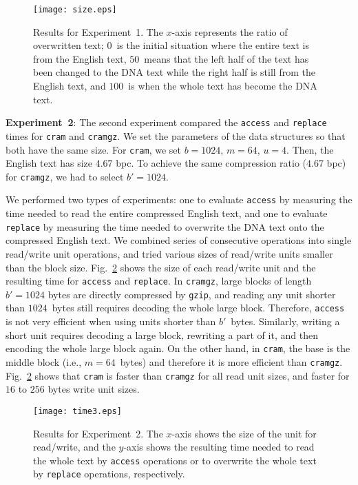 \documentclass{llncs}
\begin{document}
\begin{figure}[t!]
\begin{center}
  \texttt{[image: size.eps]}
\caption{Results for Experiment~1.
The $x$-axis represents the ratio of overwritten text;
$0$~is the initial situation where the entire text is from the English
text, $50$~means that the left half of the text has been changed to the DNA
text while the right half is still from the English text, and $100$~is
when the whole text has become the DNA text.}
\label{fig:size}
\end{center}
\end{figure}


\medskip

\noindent
\textbf{Experiment~2}:
The second experiment compared the \texttt{access} and \texttt{replace} times
for \texttt{cram} and \texttt{cramgz}.
We set the parameters of the data structures so that both have the same size.
For \texttt{cram}, we set $b = 1024$, $m = 64$, $u = 4$.
Then, the English text has size $4.67$ bpc.
To achieve the same compression ratio ($4.67$ bpc) for \texttt{cramgz}, we
had to select $b' = 1024$.

We performed two types of experiments:
one to evaluate \texttt{access} by measuring the time needed to read the
entire compressed English text, and one to evaluate \texttt{replace} by
measuring the time needed to overwrite the DNA text onto the compressed
English text.
We combined series of consecutive operations into single read/write unit
operations, and tried various sizes of read/write units smaller than the
block size.
Fig.~\ref{fig:time} shows the size of each read/write unit and the resulting
time for \texttt{access} and \texttt{replace}.
In \texttt{cramgz}, large blocks of length $b' = 1024$ bytes are directly
compressed by \texttt{gzip}, and reading any unit shorter than $1024$~bytes
still requires decoding the whole large block.
Therefore, \texttt{access} is not very efficient when using units shorter
than $b'$~bytes.
Similarly, writing a short unit requires decoding a large block, rewriting
a part of it, and then encoding the whole large block again.
On the other hand, in \texttt{cram}, the base is the middle block (i.e.,
$m = 64$~bytes) and therefore it is more efficient than \texttt{cramgz}.
Fig.~\ref{fig:time} shows that \texttt{cram} is faster than \texttt{cramgz}
for all read unit sizes, and faster for $16$ to $256$ bytes write unit sizes.


\begin{figure}[t!]
\begin{center}
  \texttt{[image: time3.eps]}
\caption{Results for Experiment~2.
The $x$-axis shows the size of the unit for read/write, and the $y$-axis
shows the resulting time needed to read the whole text by \texttt{access}
operations or to overwrite the whole text by \texttt{replace} operations,
respectively.}
\label{fig:time}
\end{center}
\end{figure}
\end{document}
